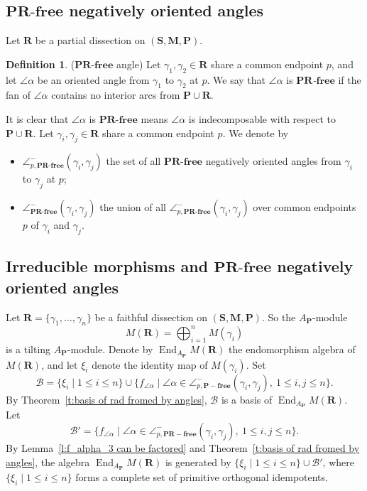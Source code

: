 \documentclass[a4paper,10pt]{amsart}
\theoremstyle{plain}          %
\theoremstyle{definition}
\newtheorem{definition}[theorem]{Definition}
\def\SS{\mathbf{S}}
\def\RR{\mathbf{R}}
\def\MM{\mathbf{M}}
\def\PP{\mathbf{P}}
\def\MM{\mathbf{M}}
\newcommand{\ha}{\angle^-}
\newcommand{\End}{\operatorname{End}\nolimits}
\begin{document}
\subsection{$\textbf{PR-free}$ negatively oriented  angles}
Let $\mathbf{R}$ be a partial dissection on $(\SS,\MM,\PP)$.
\begin{definition}($\mathbf{PR}$-$\mathbf{free}$ angle)
Let $\gamma_1, \gamma_2\in\mathbf{R}$ share a common endpoint $p$, 
and let $\angle\alpha$ be an oriented angle from $\gamma_1$ to $\gamma_2$ at $p$. We say that
 $\angle\alpha$ is \emph{$\mathbf{PR}$-$\mathbf{free}$} if the fan of $\angle\alpha$ contains no interior arcs from $\PP\cup \mathbf{R}$. 
\end{definition}

It is clear that  $\angle\alpha$ is {$\mathbf{PR}$-$\mathbf{free}$} means $\angle \alpha$ is indecomposable with respect to $\PP\cup\RR$.  Let $\gamma_i, \gamma_j\in\mathbf{R}$ share a common endpoint $p$. We denote by
\begin{itemize}
       \item $\ha_{p,\textbf{PR-free}}(\gamma_i,\gamma_j)$ the set of all $\mathbf{PR}$-$\textbf{free}$ negatively oriented angles from $\gamma_i$ to $\gamma_j$ at $p$;
    \item $\ha_{\textbf{PR-free}}(\gamma_i,\gamma_j)$ the union of all $\ha_{p,\textbf{PR-free}}(\gamma_i,\gamma_j)$ over common endpoints $p$ of $\gamma_i$ and $\gamma_j$.
\end{itemize}

\subsection{Irreducible morphisms and $\textbf{PR-free}$ negatively oriented angles}

Let $\mathbf{R}=\{\gamma_1,\dots,\gamma_n\}$ be a faithful dissection on $(\SS,\MM,\PP)$. 
So the $A_{\PP}$-module 
\[
M(\mathbf{R})=\bigoplus_{i=1}^{n} M(\gamma_i)
\]
is a  tilting $A_{\PP}$-module.
Denote by $\End_{A_{\PP}} M(\mathbf{R})$ the endomorphism algebra of $M(\mathbf{R})$, and let $\xi_i$ denote the identity map of $M(\gamma_i)$. 
Set 
\[
\mathscr{B}=\{\xi_i \mid 1 \le i \le n\}\cup\{f_{\angle\alpha} \mid \angle\alpha\in\ha_{p, \mathbf{P}-\mathbf{free}}(\gamma_i,\gamma_j),\ 1\le i,j\le n\}.
\]
By  Theorem~\ref{t:basis of rad fromed by angles}, $\mathscr{B}$ is a basis of $\End_{A_{\PP}} M(\mathbf{R})$. 
Let 
\[
\mathscr{B}'=\{f_{\angle\alpha} \mid \angle\alpha\in\ha_{p, \mathbf{PR}-\mathbf{free}}(\gamma_i,\gamma_j),\ 1\le i,j\le n\}.
\]
By Lemma~\ref{l:f_alpha_3 can be factored} and  Theorem~\ref{t:basis of rad fromed by angles}, the algebra $\End_{A_{\PP}} M(\mathbf{R})$ is generated by $\{\xi_i \mid 1\le i\le n\}\cup \mathscr{B}'$, where $\{\xi_i \mid 1\le i\le n\}$ forms a complete set of primitive orthogonal idempotents. 
\end{document}
